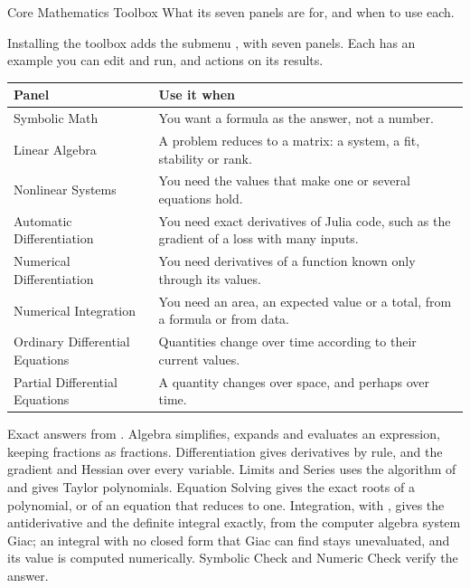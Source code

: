 
\renewcommand{\vignetteauthor}{Pollis}
\renewcommand{\vignettedate}{1 November 2026}
\renewcommand{\vignettelicense}{AGPL-3.0}



  {Core Mathematics Toolbox}
  {What its seven panels are for, and when to use each.}

Installing the toolbox adds the submenu , with seven panels. Each has an example you can edit and run, and actions on its results.

\medskip
{\small
\begin{tabularx}{\linewidth}{@{}>{\raggedright\arraybackslash}p{62mm}X@{}}
\toprule
\textbf{Panel} & \textbf{Use it when} \\\midrule
Symbolic Math & You want a formula as the answer, not a number. \\
Linear Algebra & A problem reduces to a matrix: a system, a fit, stability or rank. \\
Nonlinear Systems & You need the values that make one or several equations hold. \\
Automatic Differentiation & You need exact derivatives of Julia code, such as the gradient of a loss with many inputs. \\
Numerical Differentiation & You need derivatives of a function known only through its values. \\
Numerical Integration & You need an area, an expected value or a total, from a formula or from data. \\
Ordinary Differential Equations & Quantities change over time according to their current values. \\
Partial Differential Equations & A quantity changes over space, and perhaps over time. \\\bottomrule
\end{tabularx}}


Exact answers from . Algebra simplifies, expands and evaluates an expression, keeping fractions as fractions. Differentiation gives derivatives by rule, and the gradient and Hessian over every variable. Limits and Series uses the algorithm of  and gives Taylor polynomials. Equation Solving gives the exact roots of a polynomial, or of an equation that reduces to one. Integration, with , gives the antiderivative and the definite integral exactly, from the computer algebra system Giac; an integral with no closed form that Giac can find stays unevaluated, and its value is computed numerically. Symbolic Check and Numeric Check verify the answer.

